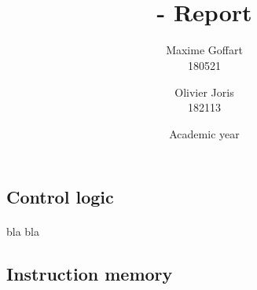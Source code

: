 \documentclass[a4paper, 11pt, oneside]{article}
\title{\ClassName\\\vspace*{0.8cm}\ProjectName - Report\vspace{1cm}}
\author{Maxime Goffart \\180521 \and Olivier Joris\\182113}
\date{\vspace{1cm}Academic year \AcademicYear}
\begin{document}
\begin{titlingpage}
{\let\newpage\relax\maketitle}
\end{titlingpage}

\thispagestyle{empty}
\newpage


\subsection*{Control logic}
\paragraph{}bla bla

\subsection*{Instruction memory}
\end{document}
